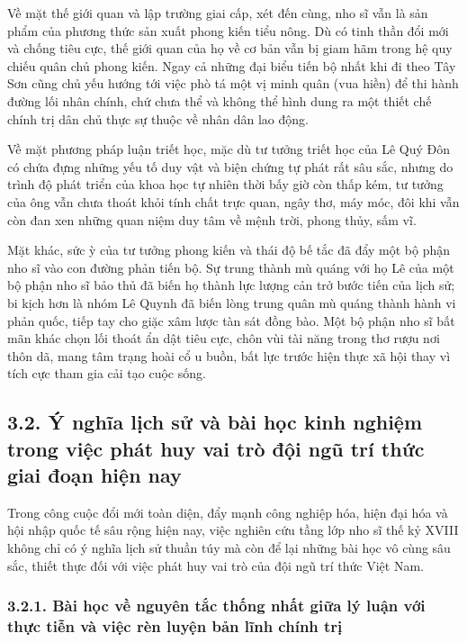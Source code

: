 Về mặt thế giới quan và lập trường giai cấp, xét đến cùng, nho sĩ vẫn là sản phẩm của phương thức sản xuất phong kiến tiểu nông. Dù có tinh thần đổi mới và chống tiêu cực, thế giới quan của họ về cơ bản vẫn bị giam hãm trong hệ quy chiếu quân chủ phong kiến. Ngay cả những đại biểu tiến bộ nhất khi đi theo Tây Sơn cũng chủ yếu hướng tới việc phò tá một vị minh quân (vua hiền) để thi hành đường lối nhân chính, chứ chưa thể và không thể hình dung ra một thiết chế chính trị dân chủ thực sự thuộc về nhân dân lao động.

Về mặt phương pháp luận triết học, mặc dù tư tưởng triết học của Lê Quý Đôn có chứa đựng những yếu tố duy vật và biện chứng tự phát rất sâu sắc, nhưng do trình độ phát triển của khoa học tự nhiên thời bấy giờ còn thấp kém, tư tưởng của ông vẫn chưa thoát khỏi tính chất trực quan, ngây thơ, máy móc, đôi khi vẫn còn đan xen những quan niệm duy tâm về mệnh trời, phong thủy, sấm vĩ.

Mặt khác, sức ỳ của tư tưởng phong kiến và thái độ bế tắc đã đẩy một bộ phận nho sĩ vào con đường phản tiến bộ. Sự trung thành mù quáng với họ Lê của một bộ phận nho sĩ bảo thủ đã biến họ thành lực lượng cản trở bước tiến của lịch sử; bi kịch hơn là nhóm Lê Quynh đã biến lòng trung quân mù quáng thành hành vi phản quốc, tiếp tay cho giặc xâm lược tàn sát đồng bào. Một bộ phận nho sĩ bất mãn khác chọn lối thoát ẩn dật tiêu cực, chôn vùi tài năng trong thơ rượu nơi thôn dã, mang tâm trạng hoài cổ u buồn, bất lực trước hiện thực xã hội thay vì tích cực tham gia cải tạo cuộc sống.

\subsection*{3.2. Ý nghĩa lịch sử và bài học kinh nghiệm trong việc phát huy vai trò đội ngũ trí thức giai đoạn hiện nay}

Trong công cuộc đổi mới toàn diện, đẩy mạnh công nghiệp hóa, hiện đại hóa và hội nhập quốc tế sâu rộng hiện nay, việc nghiên cứu tầng lớp nho sĩ thế kỷ XVIII không chỉ có ý nghĩa lịch sử thuần túy mà còn để lại những bài học vô cùng sâu sắc, thiết thực đối với việc phát huy vai trò của đội ngũ trí thức Việt Nam.

\subsubsection*{3.2.1. Bài học về nguyên tắc thống nhất giữa lý luận với thực tiễn và việc rèn luyện bản lĩnh chính trị}

